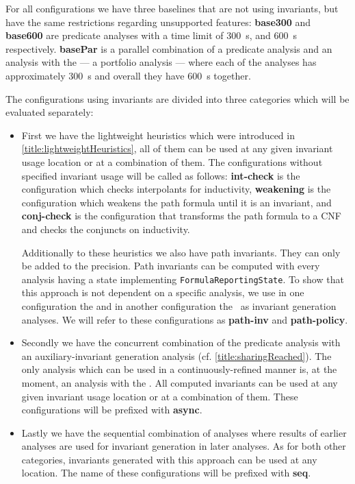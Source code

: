 For all configurations we have three baselines that are not using invariants, but have the same restrictions regarding unsupported features: \textbf{base300} and \textbf{base600}
are predicate analyses with a time limit of \SI{300}{\second}, and \SI{600}{\second} respectively. \textbf{basePar} is a parallel combination of a predicate analysis and an analysis
with the \InvariantsCPA{} --- a portfolio analysis --- where each of the analyses has approximately \SI{300}{\second} and overall they have \SI{600}{\second} together.

The configurations using invariants are divided into three categories which will be evaluated separately:
\begin{itemize}
\item First we have the lightweight heuristics which were introduced in \autoref{title:lightweightHeuristics}, all of 
them can be used at any given invariant usage location or at a combination of them. The configurations without specified invariant usage will be called as follows:
\textbf{int-check} is the configuration which checks interpolants for inductivity, \textbf{weakening} is the configuration which weakens the path formula until it is an invariant, and
\textbf{conj-check} is the configuration that transforms the path formula to a CNF and checks the conjuncts on inductivity.

Additionally to these heuristics we also have path invariants. They can only be added to the precision. Path invariants can be computed with every analysis having a state implementing \texttt{FormulaReportingState}. To show that this approach is not dependent on a specific analysis, we use in one configuration the \InvariantsCPA{} and in another configuration the \PolicyCPA{}\, as invariant generation analyses. We will refer to these configurations as \textbf{path-inv} and \textbf{path-policy}.

\item Secondly we have the concurrent combination of the predicate analysis with an auxiliary-invariant generation analysis (cf. \autoref{title:sharingReached}).
The only analysis which can be used in a continuously-refined manner is, at the moment, an analysis with the \InvariantsCPA{}.
All computed invariants can be used at any given invariant usage location or at a combination of them.
These configurations will be prefixed with \textbf{async}.

\item Lastly we have the sequential combination of analyses where results of earlier analyses are used for invariant generation in later analyses. As for both other categories,
invariants generated with this approach can be used at any location. The name of these configurations will be prefixed with \textbf{seq}.
\end{itemize}

